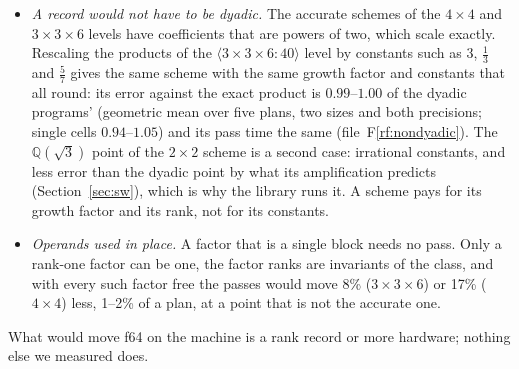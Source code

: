 \documentclass[11pt]{article}
\newcommand{\rf}[1]{F\ref{rf:#1}}
\newcommand{\mm}[1]{\langle #1\rangle}
\begin{document}
\begin{itemize}
  characteristic $0$ (for the rank-$40$ scheme a proof up to $j=5$, and for
  all but $0.07\%$ of the subsets of size up to $8$); and numerical descent on the variety of exact
  decompositions, on which $\mm{3\times3\times6:40}$ is an isolated point and
  $\mm{3\times4\times6:54}$ lies on an $8$-parameter family.  None found a
  scheme of lower rank.  These are searches near known schemes, not lower
  bounds.
\item \emph{A record would not have to be dyadic.}  The accurate schemes
  of the $4\times4$ and $3\times3\times6$ levels
  have coefficients that are powers of two, which scale exactly.  Rescaling
  the products of the $\mm{3\times3\times6:40}$ level by constants such as
  $3$, $\frac13$ and $\frac57$ gives the same scheme with the same growth
  factor and constants that all round: its error against the exact product
  is $0.99$--$1.00$ of the dyadic programs' (geometric mean over five plans,
  two sizes and both precisions; single cells $0.94$--$1.05$) and its pass
  time the same (file~\rf{nondyadic}).  The $\mathbb{Q}(\sqrt3)$ point of the
  $2\times2$ scheme is a second case: irrational constants, and less error
  than the dyadic point by what its amplification predicts
  (Section~\ref{sec:sw}), which is why the library runs it.  A scheme
  pays for its growth factor and its rank, not for its constants.
\item \emph{Operands used in place.}  A factor that is a single block needs
  no pass.  Only a rank-one factor can be one, the factor ranks are
  invariants of the class, and with every such factor free the passes would
  move 8\% ($3\times3\times6$) or 17\% ($4\times4$) less, 1--2\% of a plan,
  at a point that is not the accurate one.
\end{itemize}
What would move f64 on the machine is a rank record or more hardware;
nothing else we measured does.
\end{document}
